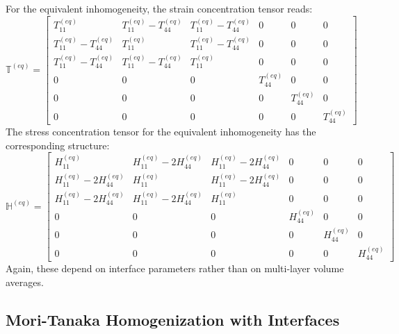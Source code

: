 \documentclass[oneside, 12pt, a4paper, bibliography=totoc]{book}
\begin{document}
For the equivalent inhomogeneity, the strain concentration tensor reads:
%
\begin{equation}
    \mathbb{T}^{(eq)} =
    \begin{bmatrix}
        T_{11}^{(eq)}  & T_{11}^{(eq)} - T_{44}^{(eq)} & T_{11}^{(eq)} - T_{44}^{(eq)} & 0 & 0 & 0 \\[4pt]
        T_{11}^{(eq)} - T_{44}^{(eq)} &  T_{11}^{(eq)} & T_{11}^{(eq)} - T_{44}^{(eq)} & 0 & 0 & 0 \\[4pt]
        T_{11}^{(eq)} - T_{44}^{(eq)} & T_{11}^{(eq)} - T_{44}^{(eq)} & T_{11}^{(eq)} & 0 & 0 & 0 \\[4pt]
        0 & 0 & 0 & T_{44}^{(eq)} & 0 & 0 \\[4pt]
        0 & 0 & 0 & 0 & T_{44}^{(eq)} & 0 \\[4pt]
        0 & 0 & 0 & 0 & 0 & T_{44}^{(eq)}
    \end{bmatrix}
    \label{eq:T_eq_interface_csa}
\end{equation}
The stress concentration tensor for the equivalent inhomogeneity has the corresponding structure:
%
\begin{equation}
    \mathbb{H}^{(eq)} =
    \begin{bmatrix}
        H_{11}^{(eq)} & H_{11}^{(eq)} - 2H_{44}^{(eq)} & H_{11}^{(eq)} - 2H_{44}^{(eq)} & 0 & 0 & 0 \\[4pt]
        H_{11}^{(eq)} - 2H_{44}^{(eq)} & H_{11}^{(eq)} & H_{11}^{(eq)} - 2H_{44}^{(eq)} & 0 & 0 & 0 \\[4pt]
        H_{11}^{(eq)} - 2H_{44}^{(eq)} & H_{11}^{(eq)} - 2H_{44}^{(eq)} & H_{11}^{(eq)} & 0 & 0 & 0 \\[4pt]
        0 & 0 & 0 & H_{44}^{(eq)} & 0 & 0 \\[4pt]
        0 & 0 & 0 & 0 & H_{44}^{(eq)} & 0 \\[4pt]
        0 & 0 & 0 & 0 & 0 & H_{44}^{(eq)}
    \end{bmatrix}
    \label{eq:H_eq_interface_csa}
\end{equation} Again, these depend on interface parameters rather than on multi-layer volume averages.

\subsection{Mori-Tanaka Homogenization with Interfaces}
\label{subsec:interface_mori_tanaka}
\end{document}
